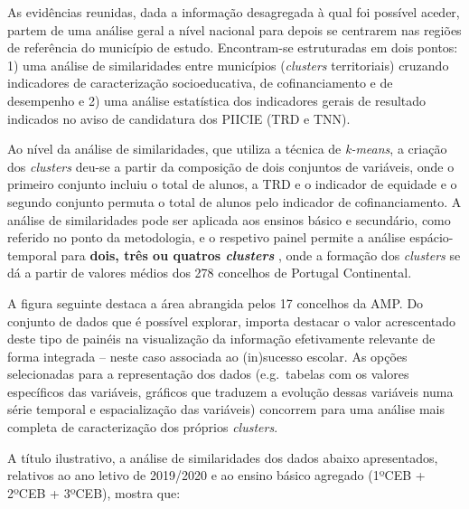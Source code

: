 \documentclass[
]{book}
\begin{document}
As evidências reunidas, dada a informação desagregada à qual foi possível aceder, partem de uma análise geral a nível nacional para depois se centrarem nas regiões de referência do município de estudo. Encontram-se estruturadas em dois pontos: 1) uma análise de similaridades entre municípios (\emph{clusters} territoriais) cruzando indicadores de caracterização socioeducativa, de cofinanciamento e de desempenho e 2) uma análise estatística dos indicadores gerais de resultado indicados no aviso de candidatura dos PIICIE (TRD e TNN).

Ao nível da análise de similaridades, que utiliza a técnica de \emph{k-means}, a criação dos \emph{clusters} deu-se a partir da composição de dois conjuntos de variáveis, onde o primeiro conjunto incluiu o total de alunos, a TRD e o indicador de equidade e o segundo conjunto permuta o total de alunos pelo indicador de cofinanciamento. A análise de similaridades pode ser aplicada aos ensinos básico e secundário, como referido no ponto da metodologia, e o respetivo painel permite a análise espácio-temporal para \textbf{dois, três ou quatros \emph{clusters} }, onde a formação dos \emph{clusters} se dá a partir de valores médios dos 278 concelhos de Portugal Continental.

A figura seguinte destaca a área abrangida pelos 17 concelhos da AMP. Do conjunto de dados que é possível explorar, importa destacar o valor acrescentado deste tipo de painéis na visualização da informação efetivamente relevante de forma integrada -- neste caso associada ao (in)sucesso escolar. As opções selecionadas para a representação dos dados (e.g.~tabelas com os valores específicos das variáveis, gráficos que traduzem a evolução dessas variáveis numa série temporal e espacialização das variáveis) concorrem para uma análise mais completa de caracterização dos próprios \emph{clusters}.

A título ilustrativo, a análise de similaridades dos dados abaixo apresentados, relativos ao ano letivo de 2019/2020 e ao ensino básico agregado (1ºCEB + 2ºCEB + 3ºCEB), mostra que:
\end{document}
